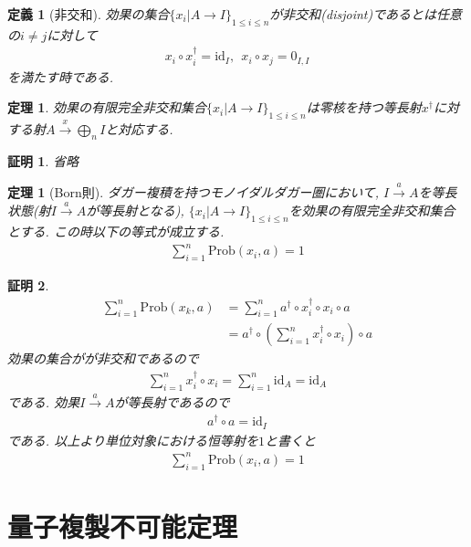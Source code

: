 \documentclass[a4paper,12pt]{ltjsarticle}
\theoremstyle{break}
\newtheorem{defn}[thm]{定義}
\newtheorem{thrm}[thm]{定理}
\newtheorem*{prf}{証明}
\newcommand{\prob}{\mathrm{Prob}}
\newcommand{\xr}[1]{\xrightarrow{#1}}
\newcommand{\id}{\mathrm{id}}
\newcommand{\ci}{\circ}
\newcommand{\da}{\dagger}
\newcommand{\bigop}{\bigoplus}
\numberwithin{equation}{section}
\begin{document}
\begin{defn}[非交和]
  効果の集合$\{x_i | A \to I\}_{1 \leq i \leq n}$が非交和(disjoint)であるとは任意の$i \neq j$に対して
  \begin{align*}
    x_i \ci x_i^\da = \id_I, ~~ x_i \ci x_j = 0_{I,I} 
  \end{align*}
  を満たす時である. 
\end{defn}

\begin{thrm}
  効果の有限完全非交和集合$\{x_i | A \to I\}_{1 \leq i \leq n}$は零核を持つ等長射$x^\da$に対する射$A \xr{x} \bigop_n I$と対応する. 
\end{thrm}

\begin{prf}
  省略
\end{prf}

\begin{thrm}[Born則]
  ダガー複積を持つモノイダルダガー圏において, $I \xr{a} A$を等長状態(射$I \xr{a} A$が等長射となる), $\{x_i | A \to I\}_{1 \leq i \leq n}$を効果の有限完全非交和集合とする. 
  この時以下の等式が成立する. 　
　\begin{align*}
    \sum_{i=1}^n \prob(x_i,a)=1
  \end{align*}
\end{thrm}

\begin{prf}
  \begin{align*}
    \sum_{i=1}^n \prob(x_k,a)
    &= \sum_{i=1}^n a^\da \ci x_i^\da \ci x_i \ci a \\
    &= a^\da \ci \left( \sum_{i=1}^n x_i^\da \ci x_i \right) \ci a
  \end{align*}
  効果の集合がが非交和であるので
  \begin{align*}
    \sum_{i=1}^n x_i^\da \ci x_i
    = \sum_{i=1}^n \id_A
    = \id_A
  \end{align*}
  である. 
  効果$I \xr{a} A$が等長射であるので
  \begin{align*}
    a^\da \ci a = \id_I
  \end{align*}
  である. 
  以上より単位対象における恒等射を$1$と書くと%
  \begin{align*}
    \sum_{i=1}^n \prob(x_i,a)=1
  \end{align*}
\end{prf}

\newpage

\section{量子複製不可能定理}
\end{document}
